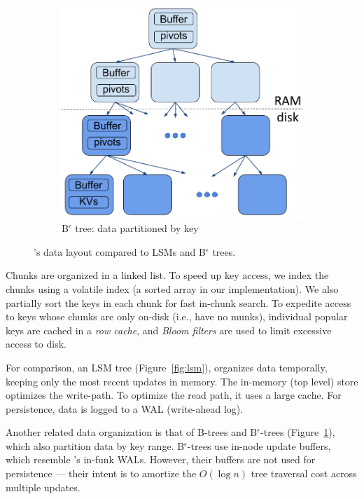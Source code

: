 \begin{figure}[tb]
\begin{subfigure}{0.3\linewidth}
\includegraphics[width=\textwidth]{Bepsilon.png}
\caption{B$^\epsilon$  tree: data partitioned by key}
\label{fig:bepsilon}
\end{subfigure}
\caption{\sys's data layout compared to LSMs and B$^\epsilon$ trees.}
\label{fig:layout}
\end{figure}


Chunks are organized in a linked list. To speed up key access, 
we index the chunks using a volatile index (a sorted array in our implementation).  
We also partially sort the keys in each chunk for fast in-chunk search.  
 To expedite access to  keys whose chunks are only on-disk  (i.e., have no munks), 
individual popular keys are cached in a \emph{row cache}, 
and \emph{Bloom filters} are used to limit excessive access to disk. 

For comparison, an LSM tree (Figure~\ref{fig:lsm}), organizes data temporally, keeping only the most recent updates in memory.
The in-memory (top level) store optimizes the write-path. To optimize the read path, it uses a large cache.   
For persistence, data is logged to a WAL (write-ahead log). 

Another related data organization is that of  B-trees and B$^\epsilon$-trees (Figure~\ref{fig:bepsilon}), which also partition data by key range. 
B$^\epsilon$-trees use in-node update buffers, which resemble \sys's in-funk WALs.
However, their buffers are not used for persistence --- their intent is to amortize the $O(\log n)$ tree traversal cost across multiple updates. 


